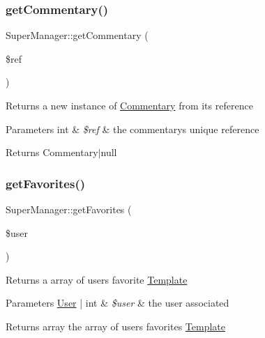 \subsubsection{\texorpdfstring{get\+Commentary()}{getCommentary()}}
{\footnotesize\ttfamily Super\+Manager\+::get\+Commentary (\begin{DoxyParamCaption}\item[{}]{\$ref }\end{DoxyParamCaption})}

Returns a new instance of \hyperlink{classCommentary}{Commentary} from its reference 
\begin{DoxyParams}[1]{Parameters}
int & {\em \$ref} & the commentary\textquotesingle{}s unique reference \\
\hline
\end{DoxyParams}
\begin{DoxyReturn}{Returns}
Commentary$\vert$null 
\end{DoxyReturn}
\mbox{\label{classSuperManager_a44ae73fb70303a49408182d4e43e7bf6}} 
\subsubsection{\texorpdfstring{get\+Favorites()}{getFavorites()}}
{\footnotesize\ttfamily Super\+Manager\+::get\+Favorites (\begin{DoxyParamCaption}\item[{}]{\$user }\end{DoxyParamCaption})}

Returns a array of user\textquotesingle{}s favorite \hyperlink{classTemplate}{Template} 
\begin{DoxyParams}[1]{Parameters}
\hyperlink{classUser}{User} | int & {\em \$user} & the user associated \\
\hline
\end{DoxyParams}
\begin{DoxyReturn}{Returns}
array the array of user\textquotesingle{}s favorites \hyperlink{classTemplate}{Template} 
\end{DoxyReturn}
\mbox{\label{classSuperManager_ae16e3a2d6fd7f0cca136eb75ea4c8d49}} 
